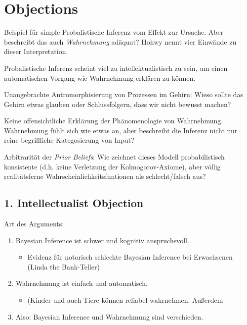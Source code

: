 \documentclass[12pt, handout]{beamer}
\begin{document}
\section{Objections}

\begin{frame}
  Beispiel für simple Probalistische Inferenz vom Effekt zur
  Ursache. Aber beschreibt das auch \emph{Wahrnehmung} adäquat? Hohwy
  nennt vier Einwände zu dieser Interpretation.  \footnotesize
    \begin{description}[<+->]
    \item[Einwand 1] Probalistische Inferenz scheint viel zu
      intellektualistisch zu sein, um einen automatischen Vorgang wie
      Wahrnehmung erklären zu können.
    \item[Einwand 2] Unangebrachte Antromorphisierung von Prozessen
      im Gehirn: Wieso sollte das Gehirn etwas glauben oder
      Schlussfolgern, dass wir nicht bewusst machen?
    \item[Einwand 3] Keine offensichtliche Erklärung der
      Phänomenologie von Wahrnehmung. Wahrnehmung fühlt sich wie etwas
      an, aber beschreibt die Inferenz nicht nur reine begriffliche
      Kategosierung von Input?
    \item[Einwand 4] Arbitrarität der \emph{Prior Beliefs}: Wie
      zeichnet dieses Modell probabilistisch konsistente (d.h. keine
      Verletzung der Kolmogorov-Axiome), aber völlig realitätsferne
      Wahrscheinlichkeitsfuntionen als schlecht/falsch aus?
    \end{description}
  \end{frame}

  \subsection{1. Intellectualist Objection}

\begin{frame}
Art des Arguments:

  \begin{enumerate}[<+->]
  \item Bayesian Inference ist schwer und kognitiv anspruchsvoll.
    \begin{itemize}[<+->]
    \item Evidenz für notorisch schlechte Bayesian Inference bei
      Erwachsenen (Linda the Bank-Teller)
    \end{itemize}
  \item Wahrnehmung ist einfach und automatisch.
    \begin{itemize}[<+->]
    \item (Kinder und auch Tiere können reliabel wahrnehmen. Außerdem
    
    \end{itemize}
\item Also: Bayesian Inference und Wahrnehmung sind verschieden.
  \end{enumerate}


\end{frame}
\end{document}
